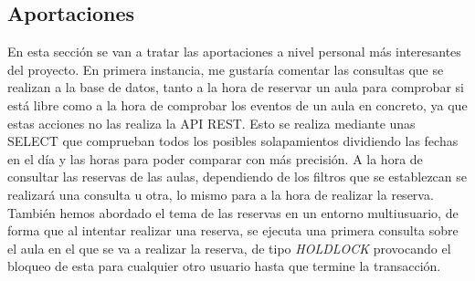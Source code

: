 \subsection{Aportaciones}
En esta sección se van a tratar las aportaciones a nivel personal más interesantes del proyecto.\newline
En primera instancia, me gustaría comentar las consultas que se realizan a la base de datos, tanto a la hora de reservar un aula para comprobar si está libre como a la hora de comprobar los eventos de un aula en concreto, ya que estas acciones no las realiza la API REST. Esto se realiza mediante unas SELECT que comprueban todos los posibles solapamientos dividiendo las fechas en el día y las horas para poder comparar con más precisión. A la hora de consultar las reservas de las aulas, dependiendo de los filtros que se establezcan se realizará una consulta u otra, lo mismo para a la hora de realizar la reserva.\newline
También hemos abordado el tema de las reservas en un entorno multiusuario, de forma que al intentar realizar una reserva, se ejecuta una primera consulta sobre el aula en el que se va a realizar la reserva, de tipo \textit{HOLDLOCK} provocando el bloqueo de esta para cualquier otro usuario hasta que termine la transacción.


